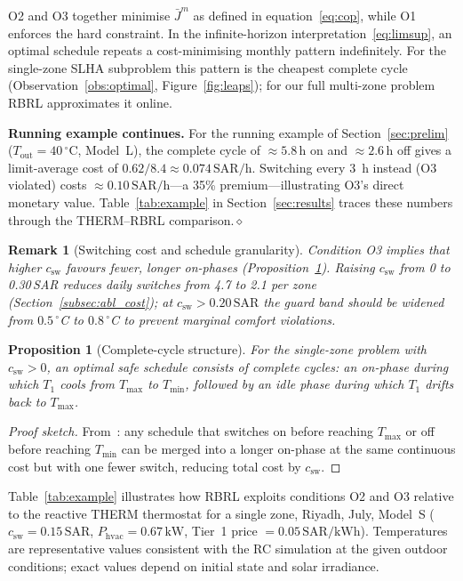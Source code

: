 \documentclass[12pt,a4paper]{article}
\newtheorem{proposition}{Proposition}
\newtheorem{remark}{Remark}
\newcommand{\Tmin}{T_{\min}}
\newcommand{\Tmax}{T_{\max}}
\newcommand{\Tout}{T_{\mathrm{out}}}
\newcommand{\csw}{c_{\mathrm{sw}}}
\newcommand{\Phvac}{P_{\mathrm{hvac}}}
\newcommand{\Jbar}{\bar{J}}
\newcommand{\SAR}{\text{SAR}}
\newcommand{\kWh}{\text{kWh}}
\begin{document}
O2 and O3 together minimise $\Jbar^m$ as defined in equation~\eqref{eq:cop},
while O1 enforces the hard constraint.
In the infinite-horizon interpretation~\eqref{eq:limsup}, an optimal
schedule repeats a cost-minimising monthly pattern indefinitely.
For the single-zone SLHA subproblem this pattern is the cheapest
complete cycle (Observation~\ref{obs:optimal}, Figure~\ref{fig:leaps});
for our full multi-zone problem RBRL approximates it online.

\noindent\textbf{Running example continues.}\;
For the running example of Section~\ref{sec:prelim} ($\Tout=40\,^\circ$C,
Model~L), the complete cycle of $\approx5.8\,\text{h}$ on and $\approx2.6\,\text{h}$
off gives a limit-average cost of $0.62/8.4\approx0.074\,\text{SAR/h}$.
Switching every 3~h instead (O3 violated) costs $\approx0.10\,\text{SAR/h}$---a 35\% premium---illustrating O3's direct monetary value.
Table~\ref{tab:example} in Section~\ref{sec:results} traces these numbers through the
THERM--RBRL comparison.\hfill$\diamond$

\begin{remark}[Switching cost and schedule granularity]
\label{rem:csw}
Condition O3 implies that higher $\csw$ favours fewer, longer on-phases
(Proposition~\ref{prop:structure}).
Raising $\csw$ from 0 to 0.30\,SAR reduces daily switches from 4.7 to
2.1 per zone (Section~\ref{subsec:abl_cost}); at $\csw>0.20\,\SAR$ the
guard band should be widened from $0.5\,^\circ$C to $0.8\,^\circ$C to
prevent marginal comfort violations.
\end{remark}

\begin{proposition}[Complete-cycle structure]
\label{prop:structure}
For the single-zone problem with $\csw>0$, an optimal safe schedule
consists of \emph{complete cycles}: an on-phase during which $T_1$
cools from $\Tmax$ to $\Tmin$, followed by an idle phase during which
$T_1$ drifts back to $\Tmax$.
\end{proposition}
\begin{proof}[Proof sketch]
From~\cite[Theorem~2]{Mousa2018}: any schedule that switches on before
reaching $\Tmax$ or off before reaching $\Tmin$ can be merged into a
longer on-phase at the same continuous cost but with one fewer switch,
reducing total cost by $\csw$.
\end{proof}

Table~\ref{tab:example} illustrates how RBRL exploits conditions O2 and
O3 relative to the reactive THERM thermostat for a single zone, Riyadh,
July, Model~S ($\csw=0.15\,\SAR$, $\Phvac=0.67\,\text{kW}$,
Tier~1 price $=0.05\,\SAR/\kWh$).
Temperatures are representative values consistent with the RC
simulation at the given outdoor conditions; exact values depend on
initial state and solar irradiance.
\end{document}
